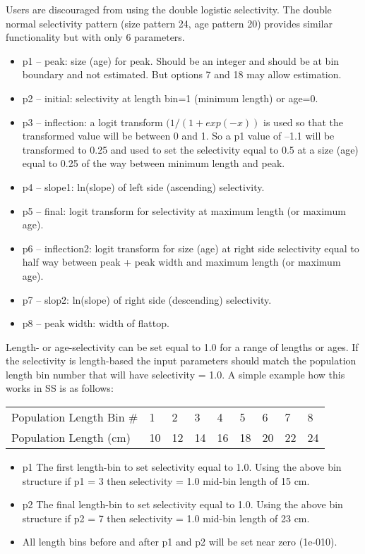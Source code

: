 Users are discouraged from using the double logistic selectivity. The double normal selectivity pattern (size pattern 24, age pattern 20) provides similar functionality but with only 6 parameters.
	\begin{itemize}
		\item  p1 – peak: size (age) for peak. Should be an integer and should be at bin boundary and not estimated.  But options 7 and 18 may allow estimation.
		\item p2 – initial: selectivity at length bin=1 (minimum length) or age=0.
		\item p3 – inflection: a logit transform $(1/(1+exp(-x))$ is used so that the transformed value will be between 0 and 1.  So a p1 value of –1.1 will be transformed to 0.25 and used to set the selectivity equal to 0.5 at a size (age) equal to 0.25 of the way between minimum length and peak. 
		\item p4 – slope1: ln(slope) of left side (ascending) selectivity.
		\item p5 – final: logit transform for selectivity at maximum length (or maximum age).
		\item p6 – inflection2:  logit transform for size (age) at right side selectivity equal to half way between peak + peak width and maximum length (or maximum age).
		\item p7 – slop2: ln(slope) of right side (descending) selectivity.
		\item p8 – peak width: width of flattop.
	\end{itemize}
	
Length- or age-selectivity can be set equal to 1.0 for a range of lengths or ages.  If the selectivity is length-based the input parameters should match the population length bin number that will have selectivity = 1.0. A simple example how this works in SS is as follows:

\begin{longtable}{p{4cm} p{0.9cm} p{0.9cm} p{0.9cm}  p{0.9cm}  p{0.9cm} p{0.9cm} p{0.9cm} p{0.9cm}}
	\hline	
	Population Length Bin \# \Tstrut &  1 &  2 &  3 &  4 &  5 &  6 &  7 &  8 \\
	Population Length (cm)       & 10 & 12 & 14 & 16 & 18 & 20 & 22 & 24 \Bstrut\\
	\hline
\end{longtable} 

\begin{itemize}
	\item p1 The first length-bin to set selectivity equal to 1.0. Using the above bin structure if p1 = 3 then selectivity = 1.0 mid-bin length of 15 cm.
	\item p2 The final length-bin to set selectivity equal to 1.0. Using the above bin structure if p2 = 7 then selectivity = 1.0 mid-bin length of 23 cm.
	\item All length bins before and after p1 and p2 will be set near zero (1e-010).
\end{itemize}

